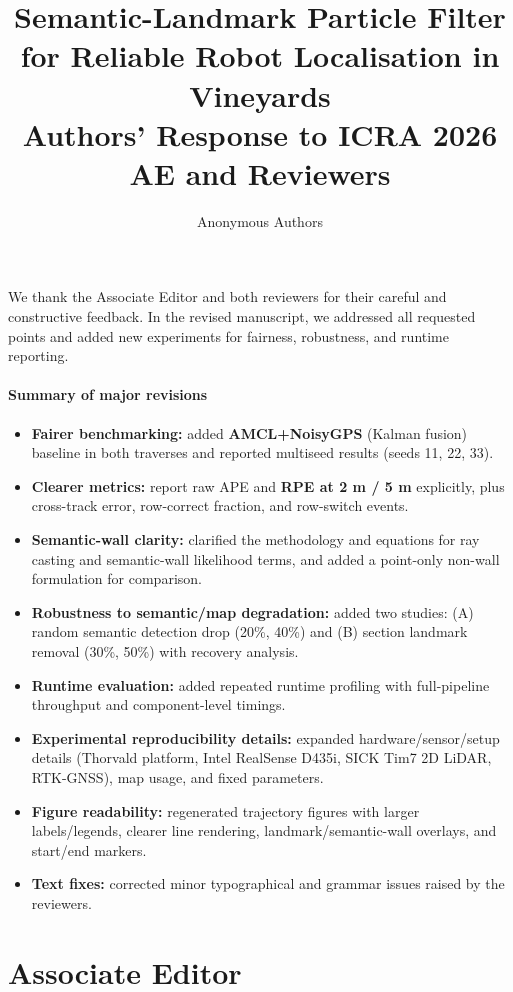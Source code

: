 \documentclass[a4paper]{article}
\title{
  \textbf{Semantic-Landmark Particle Filter for Reliable Robot Localisation in Vineyards}
  \\[\baselineskip] Authors' Response to ICRA 2026 AE and Reviewers
}
\author{Anonymous Authors}
\newcounter{todonum}
\newcommand\resettodonum{\setcounter{todonum}{0}}
\begin{document}
\maketitle
\resettodonum

We thank the Associate Editor and both reviewers for their careful and constructive feedback.
In the revised manuscript, we addressed all requested points and added new experiments for fairness,
robustness, and runtime reporting.

\paragraph{Summary of major revisions}
\begin{itemize}
  \item \textbf{Fairer benchmarking:} added \textbf{AMCL+NoisyGPS} (Kalman fusion) baseline in both traverses and reported multiseed results (seeds 11, 22, 33).
  \item \textbf{Clearer metrics:} report raw APE and \textbf{RPE at 2 m / 5 m} explicitly, plus cross-track error, row-correct fraction, and row-switch events.
  \item \textbf{Semantic-wall clarity:} clarified the methodology and equations for ray casting and semantic-wall likelihood terms, and added a point-only non-wall formulation for comparison.
  \item \textbf{Robustness to semantic/map degradation:} added two studies: (A) random semantic detection drop (20\%, 40\%) and (B) section landmark removal (30\%, 50\%) with recovery analysis.
  \item \textbf{Runtime evaluation:} added repeated runtime profiling with full-pipeline throughput and component-level timings.
  \item \textbf{Experimental reproducibility details:} expanded hardware/sensor/setup details (Thorvald platform, Intel RealSense D435i, SICK Tim7 2D LiDAR, RTK-GNSS), map usage, and fixed parameters.
  \item \textbf{Figure readability:} regenerated trajectory figures with larger labels/legends, clearer line rendering, landmark/semantic-wall overlays, and start/end markers.
  \item \textbf{Text fixes:} corrected minor typographical and grammar issues raised by the reviewers.
\end{itemize}

\newpage

\section*{Associate Editor}
\end{document}
